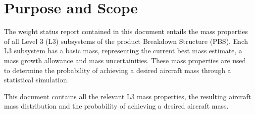 \chapter{Purpose and Scope}
\label{ch:introduction}
The weight status report contained in this document entails the mass properties of all Level 3 (L3) subsystems of the product Breakdown Structure (PBS).
Each L3 subsystem has a basic mass, representing the current best mass estimate, a mass growth allowance and mass uncertainities. 
These mass properties are used to determine the probability of achieving a desired aircraft mass through a statistical simulation.

This document contains all the relevant L3 mass properties, the resulting aircraft mass distribution and the probability of achieving a desired aircraft mass.
